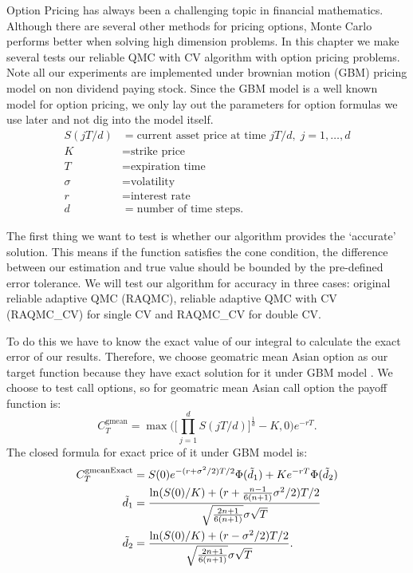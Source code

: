 
Option Pricing has always been a challenging topic in financial mathematics. 
Although there are several other methods for pricing options, Monte Carlo performs better when solving high dimension problems.
In this chapter we make several tests our reliable QMC with CV algorithm with option pricing problems. 
Note all our experiments are implemented under brownian motion (GBM) pricing model on non dividend paying stock.  
Since the GBM model is a well known model for option pricing, we only lay out the parameters for option formulas we use later and not dig into the model itself. 
\begin{align*}
    S(jT/d)&=\text{current asset price at time $jT/d,\; j=1,\dots,d$}\\
    K&=\text{strike price}\\
    T&=\text{expiration time}\\
    \sigma&=\text{volatility}\\
    r&=\text{interest rate}\\
    d&=\text{number of time steps}.
\end{align*}


The first thing we want to test is whether our algorithm provides the `accurate' solution. 
This means if the function satisfies the cone condition, the difference between our estimation and true value should be bounded by the pre-defined error tolerance. 
We will test our algorithm for accuracy in three cases: original reliable adaptive QMC (RAQMC), reliable adaptive QMC with CV (RAQMC\_CV) for single CV and RAQMC\_CV for double CV. 

To do this we have to know the exact value of our integral to calculate the exact error of our results. 
Therefore, we choose geomatric mean Asian option as our target function because they have exact solution for it under GBM model \cite{kemna1990pricing}. We choose to test call options, so for geomatric mean Asian call option the payoff function is:   
\[ C_{T}^{\mathrm{gmean}} = \max\Big(\Big[\prod_{j=1}^{d}S(jT/d) \Big]^\frac{1}{d}-K, 0\Big)e^{-rT}.\]
The closed formula for exact price of it under GBM model is: 
\begin{align}
    C_{T}^{\mathrm{gmeanExact}} 
    &= S(0)e^{-(r+\sigma^2/2)T/2}\Phi(\tilde{d}_1)+Ke^{-rT}\Phi(\tilde{d}_2)    \label{eq:exactgmean}\\
    \tilde{d}_1 &=\frac{\ln(S(0)/K)+(r+\frac{n-1}{6(n+1)}\sigma^2/2)T/2}
    {\sqrt{\frac{2n+1}{6(n+1)}}\sigma\sqrt{T}}\notag\\
    \tilde{d}_2 &=\frac{\ln(S(0)/K)+(r-\sigma^2/2)T/2}
            {\sqrt{\frac{2n+1}{6(n+1)}}\sigma\sqrt{T}}\notag.
\end{align}

